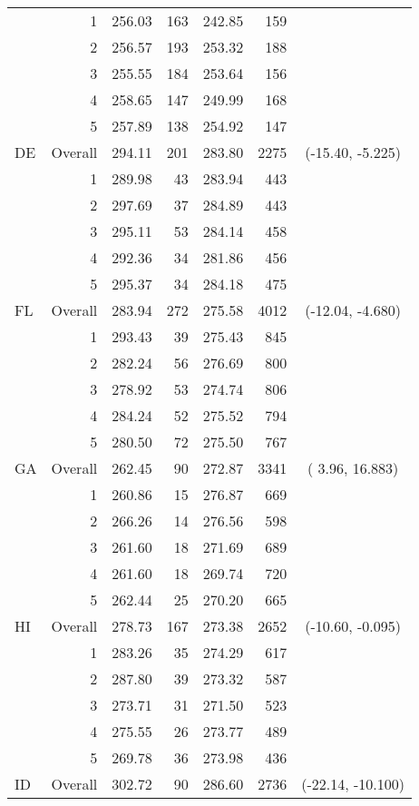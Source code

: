 \begin{longtable}{lrrr@{\extracolsep{.25cm}}rrc}
   & 1 & 256.03 & 163 & 242.85 & 159 &  \\ 
   & 2 & 256.57 & 193 & 253.32 & 188 &  \\ 
   & 3 & 255.55 & 184 & 253.64 & 156 &  \\ 
   & 4 & 258.65 & 147 & 249.99 & 168 &  \\ 
   & 5 & 257.89 & 138 & 254.92 & 147 &  \\ 
   \hline
DE & Overall & 294.11 & 201 & 283.80 & 2275 & (-15.40,  -5.225) \\ 
   & 1 & 289.98 &  43 & 283.94 & 443 &  \\ 
   & 2 & 297.69 &  37 & 284.89 & 443 &  \\ 
   & 3 & 295.11 &  53 & 284.14 & 458 &  \\ 
   & 4 & 292.36 &  34 & 281.86 & 456 &  \\ 
   & 5 & 295.37 &  34 & 284.18 & 475 &  \\ 
   \hline
FL & Overall & 283.94 & 272 & 275.58 & 4012 & (-12.04,  -4.680) \\ 
   & 1 & 293.43 &  39 & 275.43 & 845 &  \\ 
   & 2 & 282.24 &  56 & 276.69 & 800 &  \\ 
   & 3 & 278.92 &  53 & 274.74 & 806 &  \\ 
   & 4 & 284.24 &  52 & 275.52 & 794 &  \\ 
   & 5 & 280.50 &  72 & 275.50 & 767 &  \\ 
   \hline
GA & Overall & 262.45 &  90 & 272.87 & 3341 & (  3.96,  16.883) \\ 
   & 1 & 260.86 &  15 & 276.87 & 669 &  \\ 
   & 2 & 266.26 &  14 & 276.56 & 598 &  \\ 
   & 3 & 261.60 &  18 & 271.69 & 689 &  \\ 
   & 4 & 261.60 &  18 & 269.74 & 720 &  \\ 
   & 5 & 262.44 &  25 & 270.20 & 665 &  \\ 
   \hline
HI & Overall & 278.73 & 167 & 273.38 & 2652 & (-10.60,  -0.095) \\ 
   & 1 & 283.26 &  35 & 274.29 & 617 &  \\ 
   & 2 & 287.80 &  39 & 273.32 & 587 &  \\ 
   & 3 & 273.71 &  31 & 271.50 & 523 &  \\ 
   & 4 & 275.55 &  26 & 273.77 & 489 &  \\ 
   & 5 & 269.78 &  36 & 273.98 & 436 &  \\ 
   \hline
ID & Overall & 302.72 &  90 & 286.60 & 2736 & (-22.14, -10.100) \\ 

\end{longtable}
